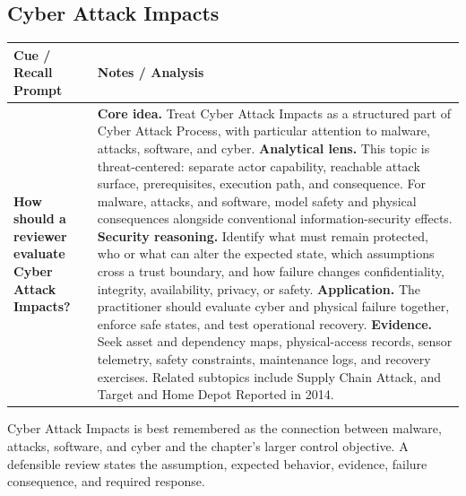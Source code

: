 \documentclass[11pt]{article}
\newcommand{\CornellHeader}{%
\rowcolor{Navy}\color{white}\bfseries Cue / Recall Prompt & \color{white}\bfseries Notes / Analysis\\\hline}
\newcommand{\CornellRow}[2]{%
\cellcolor{CueGray}\RaggedRight\textbf{#1} & \RaggedRight #2\\\hline}
\begin{document}
\subsection*{Cyber Attack Impacts}
\begin{longtable}{>{\RaggedRight\arraybackslash}p{}|>{\RaggedRight\arraybackslash}p{}}
\CornellHeader
\CornellRow{How should a reviewer evaluate Cyber Attack Impacts?}{\textbf{Core idea.} Treat Cyber Attack Impacts as a structured part of Cyber Attack Process, with particular attention to malware, attacks, software, and cyber. \textbf{Analytical lens.} This topic is threat-centered: separate actor capability, reachable attack surface, prerequisites, execution path, and consequence. For malware, attacks, and software, model safety and physical consequences alongside conventional information-security effects. \textbf{Security reasoning.} Identify what must remain protected, who or what can alter the expected state, which assumptions cross a trust boundary, and how failure changes confidentiality, integrity, availability, privacy, or safety. \textbf{Application.} The practitioner should evaluate cyber and physical failure together, enforce safe states, and test operational recovery. \textbf{Evidence.} Seek asset and dependency maps, physical-access records, sensor telemetry, safety constraints, maintenance logs, and recovery exercises. Related subtopics include Supply Chain Attack, and Target and Home Depot Reported in 2014.}
\end{longtable}
\begin{topicsummary}
Cyber Attack Impacts is best remembered as the connection between malware, attacks, software, and cyber and the chapter's larger control objective. A defensible review states the assumption, expected behavior, evidence, failure consequence, and required response.
\end{topicsummary}
\end{document}
